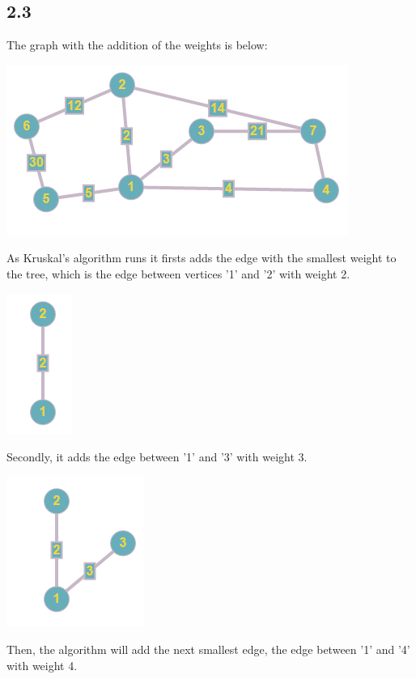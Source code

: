 \documentclass{article}
\begin{document}
\subsection*{2.3}
The graph with the addition of the weights is below:
\newline
\begin{center}
\includegraphics{b23W}
\end{center}
As Kruskal's algorithm runs it firsts adds the edge with the smallest weight to the tree, which is the edge between vertices '1' and '2' with weight 2. 
\newline
\begin{center}
\includegraphics{b231}
\end{center}
Secondly, it adds the edge between '1' and '3' with weight 3.
\newline
\begin{center}
\includegraphics{b232}
\end{center}
Then, the algorithm will add the next smallest edge, the edge between '1' and '4' with weight 4.
\end{document}
